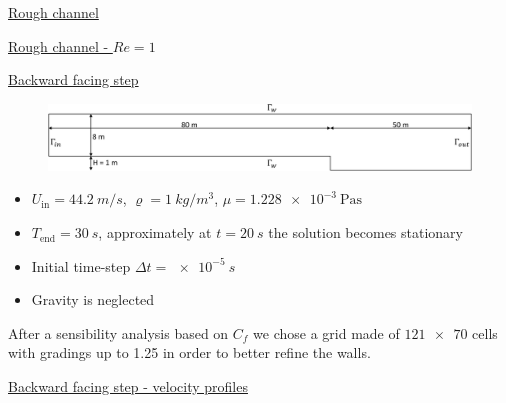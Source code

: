\documentclass{beamer}
\begin{document}
\begin{frame}{\hyperlink{rough}{Rough channel}}
	\begin{figure}
		\centering
		
	\end{figure}
\end{frame}
\begin{frame}{\hyperlink{rough}{Rough channel - $Re=1$}}
\begin{figure}
	\centering
	
\end{figure}
\end{frame}
\begin{frame}[label=bfsSupp]{\hyperlink{bfs}{Backward facing step}}
\begin{figure}
	\centering
	\includegraphics[width=\textwidth]{bfs_domain.pdf}
\end{figure}
\begin{itemize}
	\item $U_\text{in} = \SI{44.2}{m/s}$, $\varrho=\SI{1}{kg/m^3}$, 
	$\mu=\SI{1.228e-3}{\pascal\second}$
	\item $T_\text{end}=\SI{30}{s}$, approximately at $t=\SI{20}{s}$ the 
	solution becomes stationary
	\item Initial time-step $\Delta t=\SI{e-5}{s}$
	\item Gravity is neglected
\end{itemize}
After a sensibility analysis based on $C_f$ we chose a grid made of 
$\num{121x70}$ cells with gradings up to 1.25 in order to better 
refine the walls.
\end{frame}
\begin{frame}{\hyperlink{bfs}{Backward facing step - velocity profiles}}
\vspace{-0.7cm}
\begin{figure}
	\subfloat[\tiny Profile at 
	$x/H=-4$]{\hspace{-1cm}}
	\subfloat[\tiny Profile at 
	$x/H=4$]{\hspace{-0.3cm}}
\end{figure}
\end{frame}
\end{document}
